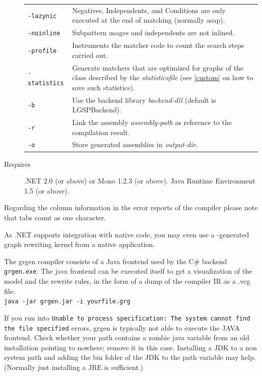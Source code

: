 \begin{description}
\begin{tabularx}{\linewidth}{lX}
      \texttt{-lazynic} & Negatives, Independents, and Conditions are only executed at the end of matching (normally asap).\\
      \texttt{-noinline} & Subpattern usages and independents are not inlined.\\
      \texttt{-profile} & Instruments the matcher code to count the search steps carried out.\\
      \texttt{-statistics} & Generate matchers that are optimized for graphs of the class described by the \emph{statisticsfile} (see \ref{custom} on how to save such statistics).\\
      \texttt{-b} & Use the backend library \emph{backend-dll} (default is LGSPBackend).\\
      \texttt{-r} & Link the assembly \emph{assembly-path} as reference to the compilation result.\\
      \texttt{-o} & Store generated assemblies in \emph{output-dir}.
    \end{tabularx}
  \item[Requires] .NET 2.0 (or above) or Mono 1.2.3 (or above). Java Runtime Environment 1.5 (or above).
\end{description}

\begin{note}
Regarding the column information in the error reports of the compiler please note that tabs count as one character.
\end{note}

\begin{note}
As .NET supports integration with native code, you may even use a \GrG-generated graph rewriting kernel from a native application.
\end{note}

\begin{note}\label{note:modelruledump}
The grgen compiler consists of a Java frontend used by the C\# backend \texttt{grgen.exe}.
The java frontend can be executed itself to get a visualization of the model and the rewrite rules,
in the form of a dump of the compiler IR as a .vcg file:\\
\texttt{java -jar grgen.jar -i yourfile.grg}
\end{note}

\begin{note}
If you run into \texttt{Unable to process specification: The system cannot find the file specified} errors, 
grgen is typically not able to execute the JAVA frontend.
Check whether your path contains a zombie java variable from an old installation pointing to nowhere; remove it in this case.
Installing a JDK to a non system path and adding the bin folder of the JDK to the path variable may help.
(Normally just installing a JRE is sufficient.)
\end{note}


